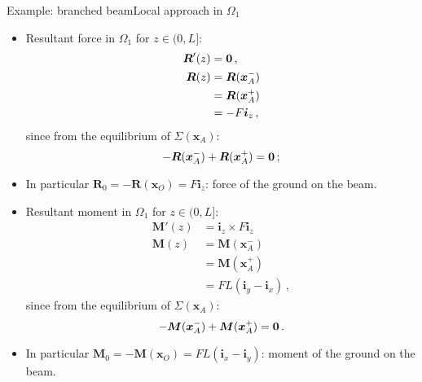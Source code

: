 \documentclass{beamer}
\newcommand{\xj}{x}
\newcommand{\yj}{y}
\newcommand{\zj}{z}
\newcommand{\xv}{{\boldsymbol\xj}}
\renewcommand{\ij}{i}
\newcommand{\iv}{{\boldsymbol\ij}}
\newcommand{\medium}{\Omega}
\newcommand{\Fresj}{R}
\newcommand{\Mresj}{M}
\newcommand{\Fres}{{\boldsymbol\Fresj}}
\newcommand{\Mres}{{\boldsymbol\Mresj}}
\newcommand{\bzero}{{\bf 0}}
\begin{document}
\begin{frame}{Example: branched beam}{Local approach in $\medium_1$}

\begin{overprint}

\begin{itemize}
\item Resultant force in $\medium_1$ for $\zj\in(0,L]$:
\begin{displaymath}
\begin{split}
\Fres'(\zj) &=\bzero\,, \\
\Fres(\zj) &=\Fres(\xv_A^-) \\
&=\Fres(\xv_A^+) \\
&=-F\iv_\zj\,,
\end{split}
\end{displaymath}
since from the equilibrium of $\Sigma(\xv_A)$:
\begin{displaymath}
-\Fres(\xv_A^-)+\Fres(\xv_A^+)=\bzero\,;
\end{displaymath}
\item In particular $\Fres_0=-\Fres(\xv_O)=F\iv_\zj$: force of the ground on the beam.
\end{itemize}

\begin{itemize}
\item Resultant moment in $\medium_1$ for $\zj\in(0,L]$:
\begin{displaymath}
\begin{split}
\Mres'(\zj) &=\iv_\zj\times F\iv_\zj \\
\Mres(\zj) &=\Mres(\xv_A^-) \\
&=\Mres(\xv_A^+) \\
&=FL(\iv_\yj-\iv_\xj)\,,
\end{split}
\end{displaymath}
since from the equilibrium of $\Sigma(\xv_A)$:
\begin{displaymath}
-\Mres(\xv_A^-)+\Mres(\xv_A^+)=\bzero\,.
\end{displaymath}
\item In particular $\Mres_0=-\Mres(\xv_O)=FL(\iv_\xj-\iv_\yj)$: moment of the ground on the beam.
\end{itemize}

\end{overprint}

\end{frame}
\end{document}
